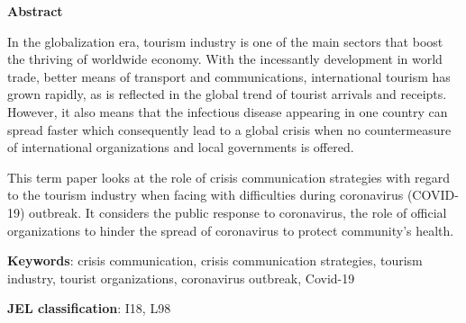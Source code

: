 \thispagestyle{plain}
\textbf{Abstract}

In the globalization era, tourism industry is one of the main sectors that boost the thriving of worldwide economy. With the incessantly development in world trade, better means of transport and communications, international tourism has grown rapidly, as is reflected in the global trend of tourist arrivals and receipts. However, it also means that the infectious disease appearing in one country can spread faster which consequently lead to a global crisis when no countermeasure of international organizations and local governments is offered.

This term paper looks at the role of crisis communication strategies with regard to the tourism industry when facing with difficulties during coronavirus (COVID-19) outbreak. It considers the public response to coronavirus, the role of official organizations to hinder the spread of coronavirus to protect community’s health.

\vspace{2cm}
\textbf{Keywords}: crisis communication, crisis communication strategies, tourism industry, tourist organizations, coronavirus outbreak, Covid-19

\vspace{1cm}
\textbf{JEL classification}: I18, L98
